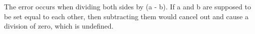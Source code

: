 The error occurs when dividing both sides by (a - b). If a and b are supposed to be set equal to each other, then subtracting them would cancel out and cause a division of zero, which is undefined.
